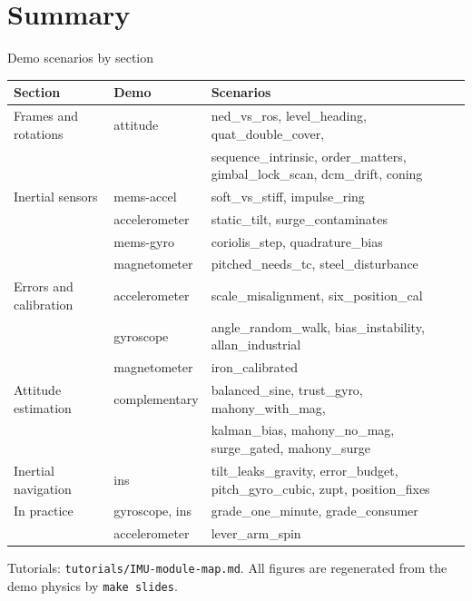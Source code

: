 \section{Summary}

\begin{frame}{Demo scenarios by section}
  \scriptsize
  \begin{tabular}{@{}lll@{}}
    \toprule
    Section & Demo & Scenarios \\
    \midrule
    Frames and rotations & attitude & ned\_vs\_ros, level\_heading, quat\_double\_cover, \\
     & & sequence\_intrinsic, order\_matters, gimbal\_lock\_scan, dcm\_drift, coning \\
    Inertial sensors & mems-accel & soft\_vs\_stiff, impulse\_ring \\
     & accelerometer & static\_tilt, surge\_contaminates \\
     & mems-gyro & coriolis\_step, quadrature\_bias \\
     & magnetometer & pitched\_needs\_tc, steel\_disturbance \\
    Errors and calibration & accelerometer & scale\_misalignment, six\_position\_cal \\
     & gyroscope & angle\_random\_walk, bias\_instability, allan\_industrial \\
     & magnetometer & iron\_calibrated \\
    Attitude estimation & complementary & balanced\_sine, trust\_gyro, mahony\_with\_mag, \\
     & & kalman\_bias, mahony\_no\_mag, surge\_gated, mahony\_surge \\
    Inertial navigation & ins & tilt\_leaks\_gravity, error\_budget, pitch\_gyro\_cubic, zupt, position\_fixes \\
    In practice & gyroscope, ins & grade\_one\_minute, grade\_consumer \\
     & accelerometer & lever\_arm\_spin \\
    \bottomrule
  \end{tabular}
  \vfill
  \normalsize Tutorials: \texttt{tutorials/IMU-module-map.md}. All figures are regenerated from the demo physics by \texttt{make slides}.
\end{frame}

